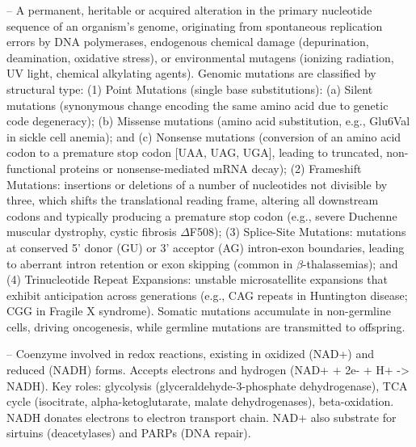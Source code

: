 -- A permanent, heritable or acquired alteration in the primary nucleotide sequence of an organism's genome, originating from spontaneous replication errors by DNA polymerases, endogenous chemical damage (depurination, deamination, oxidative stress), or environmental mutagens (ionizing radiation, UV light, chemical alkylating agents). Genomic mutations are classified by structural type: (1) Point Mutations (single base substitutions): (a) Silent mutations (synonymous change encoding the same amino acid due to genetic code degeneracy); (b) Missense mutations (amino acid substitution, e.g., Glu6Val in sickle cell anemia); and (c) Nonsense mutations (conversion of an amino acid codon to a premature stop codon [UAA, UAG, UGA], leading to truncated, non-functional proteins or nonsense-mediated mRNA decay); (2) Frameshift Mutations: insertions or deletions of a number of nucleotides not divisible by three, which shifts the translational reading frame, altering all downstream codons and typically producing a premature stop codon (e.g., severe Duchenne muscular dystrophy, cystic fibrosis $\Delta$F508); (3) Splice-Site Mutations: mutations at conserved 5' donor (GU) or 3' acceptor (AG) intron-exon boundaries, leading to aberrant intron retention or exon skipping (common in $\beta$-thalassemias); and (4) Trinucleotide Repeat Expansions: unstable microsatellite expansions that exhibit anticipation across generations (e.g., CAG repeats in Huntington disease; CGG in Fragile X syndrome). Somatic mutations accumulate in non-germline cells, driving oncogenesis, while germline mutations are transmitted to offspring.

-- Coenzyme involved in redox reactions, existing in oxidized (NAD+) and reduced (NADH) forms. Accepts electrons and hydrogen (NAD+ + 2e- + H+ -> NADH). Key roles: glycolysis (glyceraldehyde-3-phosphate dehydrogenase), TCA cycle (isocitrate, alpha-ketoglutarate, malate dehydrogenases), beta-oxidation. NADH donates electrons to electron transport chain. NAD+ also substrate for sirtuins (deacetylases) and PARPs (DNA repair).

